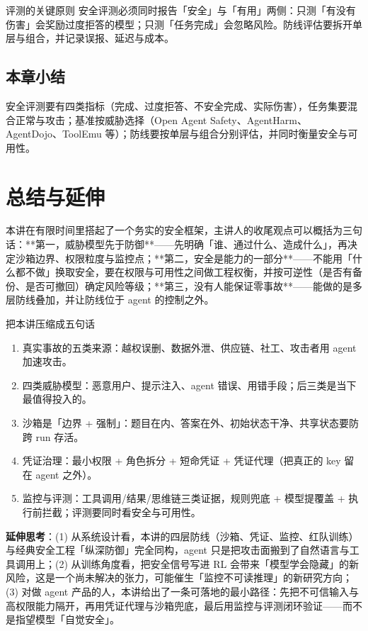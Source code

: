 ﻿\documentclass[a4paper]{article}
\begin{document}
\begin{importantbox}{评测的关键原则}
安全评测必须同时报告「安全」与「有用」两侧：只测「有没有伤害」会奖励过度拒答的模型；只测「任务完成」会忽略风险。防线评估要拆开单层与组合，并记录误报、延迟与成本。
\end{importantbox}

\subsection{本章小结}
安全评测要有四类指标（完成、过度拒答、不安全完成、实际伤害），任务集要混合正常与攻击；基准按威胁选择（Open Agent Safety、AgentHarm、AgentDojo、ToolEmu 等）；防线要按单层与组合分别评估，并同时衡量安全与可用性。

\section{总结与延伸}

本讲在有限时间里搭起了一个务实的安全框架，主讲人的收尾观点可以概括为三句话：**第一，威胁模型先于防御**——先明确「谁、通过什么、造成什么」，再决定沙箱边界、权限粒度与监控点；**第二，安全是能力的一部分**——不能用「什么都不做」换取安全，要在权限与可用性之间做工程权衡，并按可逆性（是否有备份、是否可撤回）确定风险等级；**第三，没有人能保证零事故**——能做的是多层防线叠加，并让防线位于 agent 的控制之外。

\begin{importantbox}{把本讲压缩成五句话}
\begin{enumerate}
\item 真实事故的五类来源：越权误删、数据外泄、供应链、社工、攻击者用 agent 加速攻击。
\item 四类威胁模型：恶意用户、提示注入、agent 错误、用错手段；后三类是当下最值得投入的。
\item 沙箱是「边界 + 强制」：题目在内、答案在外、初始状态干净、共享状态要防跨 run 存活。
\item 凭证治理：最小权限 + 角色拆分 + 短命凭证 + 凭证代理（把真正的 key 留在 agent 之外）。
\item 监控与评测：工具调用/结果/思维链三类证据，规则兜底 + 模型提覆盖 + 执行前拦截；评测要同时看安全与可用性。
\end{enumerate}
\end{importantbox}

\textbf{延伸思考}：(1) 从系统设计看，本讲的四层防线（沙箱、凭证、监控、红队训练）与经典安全工程「纵深防御」完全同构，agent 只是把攻击面搬到了自然语言与工具调用上；(2) 从训练角度看，把安全信号写进 RL 会带来「模型学会隐藏」的新风险，这是一个尚未解决的张力，可能催生「监控不可读推理」的新研究方向；(3) 对做 agent 产品的人，本讲给出了一条可落地的最小路径：先把不可信输入与高权限能力隔开，再用凭证代理与沙箱兜底，最后用监控与评测闭环验证——而不是指望模型「自觉安全」。
\end{document}
